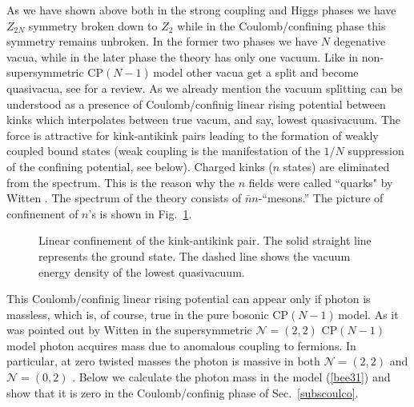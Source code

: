 \documentclass[epsfig,12pt]{article}
\newcommand{\cpn}{CP$(N-1)\,$}
\newcommand{\ntwot}{${\mathcal N}= \left(2,2\right) $ }
\newcommand{\ntwoo}{${\mathcal N}= \left(0,2\right) $ }
\begin{document}
{As we have shown above both in the strong coupling  and Higgs phases we have 
$Z_{2N}$ symmetry broken down to $Z_2$ while in the Coulomb/confining phase this
symmetry remains unbroken. In the former two phases we have $N$ degenative vacua,
while in the later phase the theory has only one vacuum. Like in non-supersymmetric
\cpn model \cite{GSY05} other vacua get a split and become quasivacua, see \cite{SYrev}
for a review. As we already 
mention the vacuum splitting can be understood as a presence of Coulomb/confinig linear
rising potential between kinks \cite{Coleman,W79} which interpolates between true vacum, and say, lowest
quasivacuum. The force is attractive for kink-antikink pairs
 leading to the formation
of weakly coupled bound states (weak coupling is the
manifestation of the $1/N$ suppression of the confining potential, see below).
Charged kinks ($n$ states) are eliminated from the spectrum. This is the reason
why the
$n$ fields were called ``quarks" by Witten \cite{W79}. The spectrum
of the theory consists of $\bar{n} n$-``mesons.'' The picture of
confinement of $n$'s is shown in Fig.~\ref{fig:conf}.

\begin{figure}
\epsfxsize=8cm
\centerline{}
\caption{\small 
Linear confinement of the kink-antikink pair.
The solid straight line represents the ground state.
The dashed line shows
the vacuum energy density of the lowest quasivacuum.}
\label{fig:conf}
\end{figure}


This Coulomb/confinig linear rising potential can appear only if photon is massless,
which is, of course, true in the pure bosonic \cpn model. As it was pointed out by Witten \cite{W79}
in the supersymmetric \ntwot \cpn model photon  acquires mass due to anomalous coupling to fermions.
In particular, at zero twisted masses the photon is massive in both \ntwot \cite{W79} and
\ntwoo \cite{SYhet}. Below we calculate the photon mass in the model (\ref{bee31}) and
show that it is zero in the Coulomb/confinig phase of Sec.~\ref{subscoulco}.


}
\end{document}
